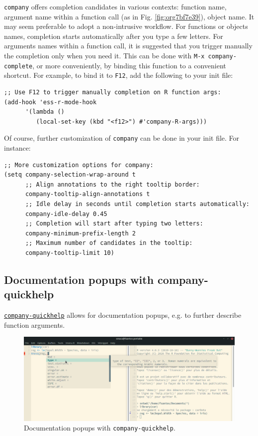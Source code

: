 \documentclass[11pt]{article}
\begin{document}
\texttt{company} offers completion candidates in various contexts: function name, argument name within a function call (as in Fig. \ref{fig:org7bf7e39}), object name. It may seem preferable to adopt a non-intrusive workflow. For functions or objects names, completion starts automatically after you type a few letters. For arguments names within a function call, it is suggested that you trigger manually the completion only when you need it. This can be done with \texttt{M-x company-complete}, or more conveniently, by binding this function to a convenient shortcut. For example, to bind it to \texttt{F12}, add the following to your init file:

\begin{verbatim}
;; Use F12 to trigger manually completion on R function args:
(add-hook 'ess-r-mode-hook
	  '(lambda ()
	     (local-set-key (kbd "<f12>") #'company-R-args)))
\end{verbatim}

\pagebreak

Of course, further customization of \texttt{company} can be done in your init file. For instance:

\begin{verbatim}
;; More customization options for company:
(setq company-selection-wrap-around t
      ;; Align annotations to the right tooltip border:
      company-tooltip-align-annotations t
      ;; Idle delay in seconds until completion starts automatically:
      company-idle-delay 0.45
      ;; Completion will start after typing two letters:
      company-minimum-prefix-length 2
      ;; Maximum number of candidates in the tooltip:
      company-tooltip-limit 10)
\end{verbatim}

\subsection{Documentation popups with company-quickhelp}
\label{sec:org1fac874}
\href{https://github.com/company-mode/company-quickhelp}{\texttt{company-quickhelp}} allows for documentation popups, e.g. to further describe function arguments.

\begin{figure}[htbp]
\centering
\includegraphics[width=\textwidth]{./images/company-quickhelp.png}
\caption{Documentation popups with \texttt{company-quickhelp}.}
\end{figure}
\end{document}
